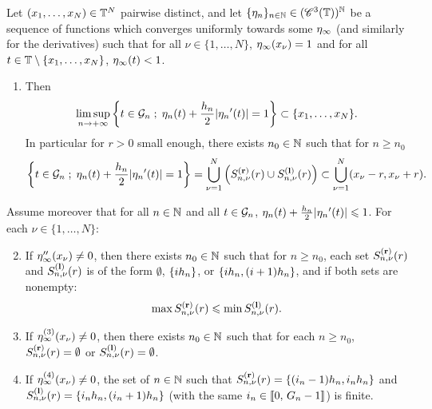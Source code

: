 \begin{lem}
  Let $(x_1,\ldots, x_N)\in \mathbb{T}^N$ pairwise distinct, and let $\{\eta_n\}_{n\in\mathbb{N}}\in (\mathscr{C}^3(\mathbb{T}))^{\mathbb{N}}$ be a sequence of functions which converges uniformly towards some $\eta_\infty$ (and similarly for the derivatives) such that for all $\nu\in\{1,\ldots, N\}$, $\eta_\infty(x_\nu)=1$ and for all $t\in \mathbb{T}\setminus\{x_1,\ldots,x_N\}$, $\eta_\infty(t)<1$.

\begin{enumerate}
  \item Then 
\begin{align}
  \limsup_{n\to +\infty} \left\{ t\in \mathcal{G}_n \;;\; \eta_n(t)+\frac{{h_n}}{2}|{\eta_n}'(t)|=1 \right\}\subset \{x_1,\ldots, x_N\}.\label{eq-cbp-limsup}
\end{align} In particular for $r>0$ small enough,
there exists $n_0\in\mathbb{N}$ such that for $n\geq n_0$
 \begin{align*}
   \left\{ t\in \mathcal{G}_n \;;\; \eta_n(t)+\frac{{h_n}}{2}|{\eta_n}'(t)|=1 \right\} = \bigcup_{\nu=1}^N  \left(S_{n,\nu}^{\mathbf{(r)}}(r)\cup  S_{n,\nu}^{\mathbf{(l)}}(r)\right) \subset \bigcup_{\nu=1}^N(x_\nu-r,x_\nu+r).
 \end{align*}
\end{enumerate}
Assume moreover that for all $n\in\mathbb{N}$ and all $t\in\mathcal{G}_n$, $\eta_n(t)+\frac{{h_n}}{2}|{\eta_n}'(t)| \leqslant 1$. For each $\nu \in\{1,\ldots,N\}$:
\begin{enumerate}
\setcounter{enumi}{1}
\item\label{item-deriv2} If $\eta_\infty''(x_\nu)\neq 0$, then there exists $n_0\in\mathbb{N}$ such that for $n\geq n_0$, each set $S_{n,\nu}^{\mathbf{(r)}}(r)$ and $S_{n,\nu}^{\mathbf{(l)}}(r)$ is of the form
$\emptyset$, $\{i{h_n}\}$, or $\{i{h_n},(i+1){h_n}\}$, and if both sets are nonempty:
\begin{align*}
  \max S_{n,\nu}^{\mathbf{(r)}}(r) \leqslant \min S_{n,\nu}^{\mathbf{(l)}}(r).
\end{align*}

\item If $\eta_\infty^{(3)}(x_\nu)\neq 0$, then there exists $n_0\in\mathbb{N}$ such that for each $n\geq n_0$, $S_{n,\nu}^{\mathbf{(r)}}(r)=\emptyset$ or $S_{n,\nu}^{\mathbf{(l)}}(r)=\emptyset$.
\item\label{item-deriv4} If $\eta_\infty^{(4)}(x_\nu)\neq 0$, the set of $n\in\mathbb{N}$ such that $S_{n,\nu}^{\mathbf{(r)}}(r)=\{(i_n-1){h_n},i_n{h_n}\}$ and $S_{n,\nu}^{\mathbf{(l)}} (r)= \{i_n{h_n},(i_n+1){h_n}\}$ (with the same $i_n\in\llbracket 0,\,{G_n}-1 \rrbracket$) is finite.
\end{enumerate}
\label{lem-cbp-dualspikes}
\end{lem}

